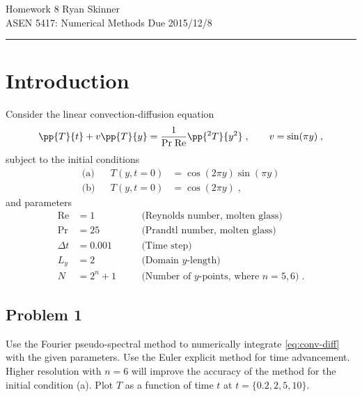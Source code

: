 \documentclass[11pt]{article}
\begin{document}
\pagestyle{fancyplain}
\lhead{}
\chead{}
\rhead{}
\cfoot{\hrule \thepage}

\noindent
{\Large Homework 8}
\hfill
{\large Ryan Skinner}
\\[0.5ex]
{\large ASEN 5417: Numerical Methods}
\hfill
{\large Due 2015/12/8}\\
\hrule
\vspace{6pt}

\section{Introduction} %

Consider the linear convection-diffusion equation
\begin{equation}
\pp{T}{t} + v \pp{T}{y} = \frac{1}{\text{Pr}\;\text{Re}} \pp{^2T}{y^2}
\;, \qquad
v = \sin(\pi y)
\;,
\label{eq:conv-diff}
\end{equation}
subject to the initial conditions
\begin{equation}
\begin{aligned}
\text{(a)} && T(y,t=0) &= \cos(2 \pi y) \sin(\pi y) \\
\text{(b)} && T(y,t=0) &= \cos(2 \pi y)
\;,
\end{aligned}
\end{equation}
and parameters
\begin{equation}
\begin{aligned}
\text{Re} &= 1 &\quad &\text{(Reynolds number, molten glass)} \\
\text{Pr} &= 25 &\quad &\text{(Prandtl number, molten glass)} \\
\Delta t &= 0.001 &\quad &\text{(Time step)} \\
L_y &= 2 &\quad &\text{(Domain $y$-length)} \\
N &= 2^n + 1 &\quad &\text{(Number of $y$-points, where $n=5,6$)}
\;.
\end{aligned}
\end{equation}

\subsection{Problem 1}

Use the Fourier pseudo-spectral method to numerically integrate \eqref{eq:conv-diff} with the given parameters. Use the Euler explicit method for time advancement. Higher resolution with $n=6$ will improve the accuracy of the method for the initial condition (a). Plot $T$ as a function of time $t$ at $t = \{0.2, 2, 5, 10\}$.
\end{document}
